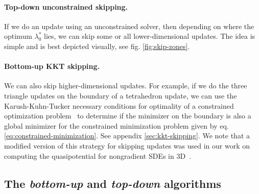 \documentclass[smallcondensed]{svjour3}
\begin{document}
\paragraph{Top-down unconstrained skipping.} If we do an update using
an unconstrained solver, then depending on where the optimum
$\lambda_0^*$ lies, we can skip some or all lower-dimensional
updates. The idea is simple and is best depicted visually, see fig.\@
\ref{fig:skip-zones}.

\paragraph{Bottom-up KKT skipping.} We can also skip
higher-dimensional updates. For example, if we do the three triangle
updates on the boundary of a tetrahedron update, we can use the
Karush-Kuhn-Tucker necessary conditions for optimality of a
constrained optimization problem~\cite{nocedal2006numerical} to
determine if the minimizer on the boundary is also a global minimizer
for the constrained minimization problem given by eq.\@
\ref{eq:constrained-minimization}. See appendix\@
\ref{sec:kkt-skipping}. We note that a modified version of this
strategy for skipping updates was used in our work on computing the
quasipotential for nongradient SDEs in 3D~\cite{yang2019computing}.

\subsection{The \emph{bottom-up} and \emph{top-down} algorithms}\label{ssec:top-down-and-bottom-up}
\end{document}
